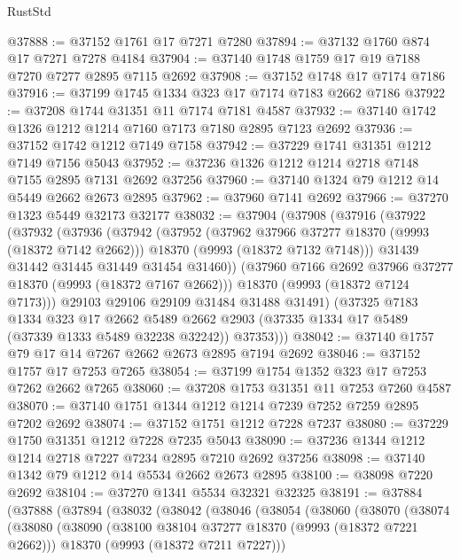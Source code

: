 \begin{lexlean}{RustStd}
\begin{coremodule}
@37888 := @37152 @1761 @17 @7271 @7280
@37894 := @37132 @1760 @874 @17 @7271 @7278 @4184
@37904 := @37140 @1748 @1759 @17 @19 @7188 @7270 @7277 @2895 @7115 @2692
@37908 := @37152 @1748 @17 @7174 @7186
@37916 := @37199 @1745 @1334 @323 @17 @7174 @7183 @2662 @7186
@37922 := @37208 @1744 @31351 @11 @7174 @7181 @4587
@37932 := @37140 @1742 @1326 @1212 @1214 @7160 @7173 @7180 @2895 @7123 @2692
@37936 := @37152 @1742 @1212 @7149 @7158
@37942 := @37229 @1741 @31351 @1212 @7149 @7156 @5043
@37952 := @37236 @1326 @1212 @1214 @2718 @7148 @7155 @2895 @7131 @2692 @37256
@37960 := @37140 @1324 @79 @1212 @14 @5449 @2662 @2673 @2895
@37962 := @37960 @7141 @2692
@37966 := @37270 @1323 @5449 @32173 @32177
@38032 := @37904
    (@37908
      (@37916
        (@37922
          (@37932
            (@37936
              (@37942
                (@37952
                  (@37962 @37966 @37277 @18370 (@9993 (@18372 @7142 @2662)))
                  @18370
                  (@9993 (@18372 @7132 @7148)))
                @31439
                @31442
                @31445
                @31449
                @31454
                @31460))
            (@37960 @7166 @2692 @37966 @37277 @18370 (@9993 (@18372 @7167 @2662)))
            @18370
            (@9993 (@18372 @7124 @7173)))
          @29103
          @29106
          @29109
          @31484
          @31488
          @31491)
        (@37325
          @7183
          @1334
          @323
          @17
          @2662
          @5489
          @2662
          @2903
          (@37335 @1334 @17 @5489 (@37339 @1333 @5489 @32238 @32242))
          @37353)))
@38042 := @37140 @1757 @79 @17 @14 @7267 @2662 @2673 @2895 @7194 @2692
@38046 := @37152 @1757 @17 @7253 @7265
@38054 := @37199 @1754 @1352 @323 @17 @7253 @7262 @2662 @7265
@38060 := @37208 @1753 @31351 @11 @7253 @7260 @4587
@38070 := @37140 @1751 @1344 @1212 @1214 @7239 @7252 @7259 @2895 @7202 @2692
@38074 := @37152 @1751 @1212 @7228 @7237
@38080 := @37229 @1750 @31351 @1212 @7228 @7235 @5043
@38090 := @37236 @1344 @1212 @1214 @2718 @7227 @7234 @2895 @7210 @2692 @37256
@38098 := @37140 @1342 @79 @1212 @14 @5534 @2662 @2673 @2895
@38100 := @38098 @7220 @2692
@38104 := @37270 @1341 @5534 @32321 @32325
@38191 := @37884
    (@37888
      (@37894
        (@38032
          (@38042
            (@38046
              (@38054
                (@38060
                  (@38070
                    (@38074
                      (@38080
                        (@38090
                          (@38100 @38104 @37277 @18370 (@9993 (@18372 @7221 @2662)))
                          @18370
                          (@9993 (@18372 @7211 @7227)))

\end{coremodule}
\end{lexlean}
